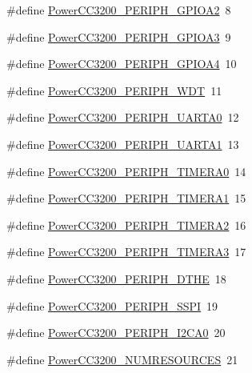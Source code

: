 \begin{DoxyCompactItemize}
\item 
\#define \hyperlink{_power_c_c3200_8h_a0cd81475a3475e8477eba42260cb58db}{Power\+C\+C3200\+\_\+\+P\+E\+R\+I\+P\+H\+\_\+\+G\+P\+I\+O\+A2}~8
\item 
\#define \hyperlink{_power_c_c3200_8h_a2e0f9b47e529c90a598229c6edbae1dd}{Power\+C\+C3200\+\_\+\+P\+E\+R\+I\+P\+H\+\_\+\+G\+P\+I\+O\+A3}~9
\item 
\#define \hyperlink{_power_c_c3200_8h_a350bbdef6de035fabdb990ec7ea5ea9d}{Power\+C\+C3200\+\_\+\+P\+E\+R\+I\+P\+H\+\_\+\+G\+P\+I\+O\+A4}~10
\item 
\#define \hyperlink{_power_c_c3200_8h_a6bec8e5045d950d4716616ac8dfd24d9}{Power\+C\+C3200\+\_\+\+P\+E\+R\+I\+P\+H\+\_\+\+W\+D\+T}~11
\item 
\#define \hyperlink{_power_c_c3200_8h_ae49279b2eb7a968549459f15e5c5f66e}{Power\+C\+C3200\+\_\+\+P\+E\+R\+I\+P\+H\+\_\+\+U\+A\+R\+T\+A0}~12
\item 
\#define \hyperlink{_power_c_c3200_8h_ac0e648dd15ce6221ad55061dccf1278d}{Power\+C\+C3200\+\_\+\+P\+E\+R\+I\+P\+H\+\_\+\+U\+A\+R\+T\+A1}~13
\item 
\#define \hyperlink{_power_c_c3200_8h_a9a93066636a929772de6073effb379e2}{Power\+C\+C3200\+\_\+\+P\+E\+R\+I\+P\+H\+\_\+\+T\+I\+M\+E\+R\+A0}~14
\item 
\#define \hyperlink{_power_c_c3200_8h_aada69d40cddbc56dacecc349492d240e}{Power\+C\+C3200\+\_\+\+P\+E\+R\+I\+P\+H\+\_\+\+T\+I\+M\+E\+R\+A1}~15
\item 
\#define \hyperlink{_power_c_c3200_8h_a2d1b25f741325c53c433a146e4e45215}{Power\+C\+C3200\+\_\+\+P\+E\+R\+I\+P\+H\+\_\+\+T\+I\+M\+E\+R\+A2}~16
\item 
\#define \hyperlink{_power_c_c3200_8h_a735b9405ef7164bfea7d6c2876980c98}{Power\+C\+C3200\+\_\+\+P\+E\+R\+I\+P\+H\+\_\+\+T\+I\+M\+E\+R\+A3}~17
\item 
\#define \hyperlink{_power_c_c3200_8h_a7ae865cefff2ec3cdab96a6969a688c9}{Power\+C\+C3200\+\_\+\+P\+E\+R\+I\+P\+H\+\_\+\+D\+T\+H\+E}~18
\item 
\#define \hyperlink{_power_c_c3200_8h_ac0f1e38ab7cc8f626c628b792a069edd}{Power\+C\+C3200\+\_\+\+P\+E\+R\+I\+P\+H\+\_\+\+S\+S\+P\+I}~19
\item 
\#define \hyperlink{_power_c_c3200_8h_ac8eadfc6bfef3d3d5f55362915b1c801}{Power\+C\+C3200\+\_\+\+P\+E\+R\+I\+P\+H\+\_\+\+I2\+C\+A0}~20
\item 
\#define \hyperlink{_power_c_c3200_8h_a03c7ec2b53c1e67cd2f4f16a4c56a079}{Power\+C\+C3200\+\_\+\+N\+U\+M\+R\+E\+S\+O\+U\+R\+C\+E\+S}~21
\item 

\end{DoxyCompactItemize}
